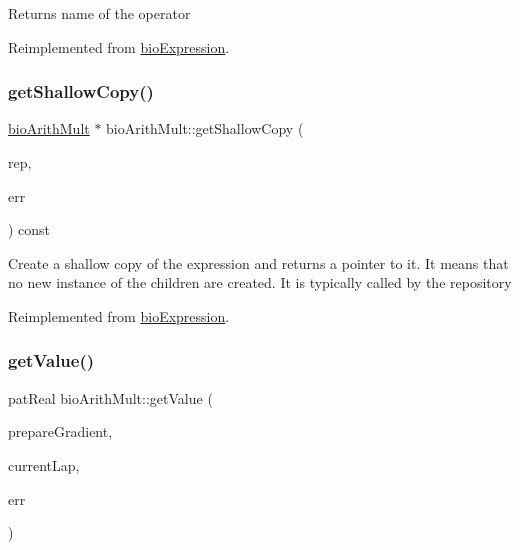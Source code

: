 \begin{DoxyReturn}{Returns}
name of the operator 
\end{DoxyReturn}


Reimplemented from \hyperlink{classbio_expression_a2353a4afb3a2b0af7c63aba086a72bde}{bio\+Expression}.

\mbox{\label{classbio_arith_mult_a58d1f8dec3f450d17bbdfe4f98b18c19}} 
\subsubsection{\texorpdfstring{get\+Shallow\+Copy()}{getShallowCopy()}}
{\footnotesize\ttfamily \hyperlink{classbio_arith_mult}{bio\+Arith\+Mult} $\ast$ bio\+Arith\+Mult\+::get\+Shallow\+Copy (\begin{DoxyParamCaption}\item[{\hyperlink{classbio_expression_repository}{bio\+Expression\+Repository} $\ast$}]{rep,  }\item[{pat\+Error $\ast$\&}]{err }\end{DoxyParamCaption}) const\hspace{0.3cm}{\ttfamily [virtual]}}

Create a shallow copy of the expression and returns a pointer to it. It means that no new instance of the children are created. It is typically called by the repository 

Reimplemented from \hyperlink{classbio_expression_a442534762693b92baaf33928979a1bf8}{bio\+Expression}.

\mbox{\label{classbio_arith_mult_a5f0d4c6fe299be5b88cbcab100def6c9}} 
\subsubsection{\texorpdfstring{get\+Value()}{getValue()}}
{\footnotesize\ttfamily pat\+Real bio\+Arith\+Mult\+::get\+Value (\begin{DoxyParamCaption}\item[{pat\+Boolean}]{prepare\+Gradient,  }\item[{pat\+U\+Long}]{current\+Lap,  }\item[{pat\+Error $\ast$\&}]{err }\end{DoxyParamCaption})\hspace{0.3cm}{\ttfamily [virtual]}}

